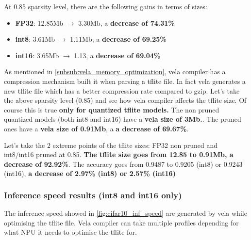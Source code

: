 At 0.85 sparsity level, there are the following gains in terms of sizes:
\begin{itemize}
    \item \textbf{FP32}: 12.85Mb $\rightarrow$ 3.30Mb, a \textbf{decrease of 74.31\%}
    \item \textbf{int8}: 3.61Mb $\rightarrow$ 1.11Mb, a \textbf{decrease of 69.25\%}
    \item \textbf{int16}: 3.65Mb $\rightarrow$ 1.13, a \textbf{decrease of 69.04\%}
\end{itemize}

As mentioned in \autoref{subsub:vela_memory_optimization}, vela compiler has a
compression mechanism built it when parsing a tflite file. In fact vela
generates a new tflite file which has a better compression rate compared to
gzip. Let's take the above sparsity level (0.85) and see how vela compiler
affects the tflite size. Of course this is true \textbf{only for quantized
tflite models.}
The non pruned quantized models (both int8 and int16) have a \textbf{vela size
of 3Mb.}. The pruned ones have a \textbf{vela size of 0.91Mb}, a \textbf{a
decrease of 69.67\%}.

Let's take the 2 extreme points of the tflite sizes: FP32 non pruned and
int8/int16 pruned at 0.85. \textbf{The tflite size goes from 12.85 to 0.91Mb,
a decrease of 92.92\%}. The accuracy goes from 0.9487 to 0.9205
(int8) or 0.9243 (int16), \textbf{a decrease of 2.97\% (int8) or 2.57\% (int16)}

\subsubsection{Inference speed results (int8 and int16 only)}
The inference speed showed in \autoref{fig:cifar10_inf_speed} are generated by
vela while optimising the tflite file. Vela compiler can take multiple profiles
depending for what NPU it needs to optimise the tflite for.


